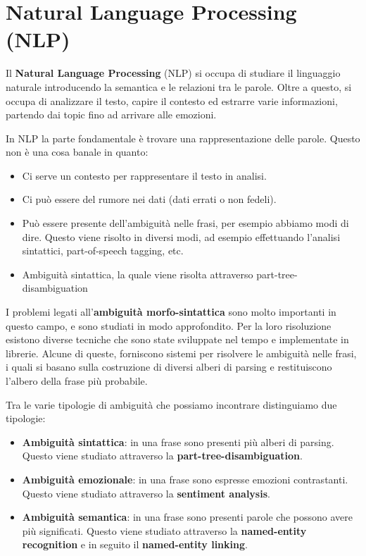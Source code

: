 \chapter{Natural Language Processing (NLP)}
Il \textbf{Natural Language Processing} (NLP) si occupa di studiare il linguaggio
naturale introducendo la semantica e le relazioni tra le parole. Oltre a questo,
si occupa di analizzare il testo, capire il contesto ed estrarre varie informazioni,
partendo dai topic fino ad arrivare alle emozioni.

In NLP la parte fondamentale è trovare una rappresentazione delle parole. Questo
non è una cosa banale in quanto:
\begin{itemize}
      \item Ci serve un contesto per rappresentare il testo in analisi.
      \item Ci può essere del rumore nei dati (dati errati o non fedeli).
      \item Può essere presente dell'ambiguità nelle frasi, per esempio abbiamo
            modi di dire. Questo viene risolto in diversi modi, ad esempio
            effettuando l'analisi sintattici, part-of-speech tagging, etc.
      \item Ambiguità sintattica, la quale viene risolta attraverso part-tree-disambiguation
\end{itemize}
I problemi legati all'\textbf{ambiguità morfo-sintattica} sono molto importanti
in questo campo, e sono studiati in modo approfondito. Per la loro risoluzione
esistono diverse tecniche che sono state sviluppate nel tempo e implementate in
librerie. Alcune di queste, forniscono sistemi per risolvere le ambiguità nelle
frasi, i quali si basano sulla costruzione di diversi alberi di parsing e
restituiscono l'albero della frase più probabile.

Tra le varie tipologie di ambiguità che possiamo incontrare distinguiamo due
tipologie:
\begin{itemize}
      \item \textbf{Ambiguità sintattica}: in una frase sono presenti più alberi
            di parsing. Questo viene studiato attraverso la \textbf{part-tree-disambiguation}.
      \item \textbf{Ambiguità emozionale}: in una frase sono espresse emozioni
            contrastanti. Questo viene studiato attraverso la \textbf{sentiment analysis}.
      \item \textbf{Ambiguità semantica}: in una frase sono presenti parole che
            possono avere più significati. Questo viene studiato attraverso la
            \textbf{named-entity recognition} e in seguito il \textbf{named-entity
                  linking}.
\end{itemize}
